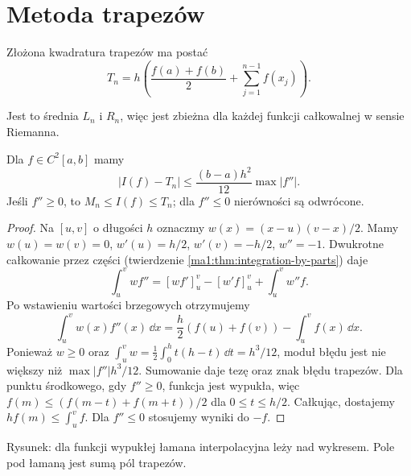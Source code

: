 \section{Metoda trapezów}
\begin{definicja}
\label{ma1:def:trapezoid}
Złożona kwadratura trapezów ma postać
\[
 T_n=h\left(\frac{f(a)+f(b)}2+\sum_{j=1}^{n-1}f(x_j)\right).
\]
\end{definicja}
Jest to średnia $L_n$ i $R_n$, więc jest zbieżna dla każdej funkcji całkowalnej w sensie Riemanna.
\begin{twierdzenie}
\label{ma1:thm:trapezoid-error}
Dla $f\in C^2[a,b]$ mamy
\[
 |I(f)-T_n|\le\frac{(b-a)h^2}{12}\max|f''|.
\]
Jeśli $f''\ge0$, to $M_n\le I(f)\le T_n$; dla $f''\le0$ nierówności są odwrócone.
\end{twierdzenie}
\begin{proof}
Na $[u,v]$ o długości $h$ oznaczmy $w(x)=(x-u)(v-x)/2$. Mamy $w(u)=w(v)=0$, $w'(u)=h/2$, $w'(v)=-h/2$, $w''=-1$. Dwukrotne całkowanie przez części (twierdzenie \ref{ma1:thm:integration-by-parts}) daje
\[
 \int_u^v wf''=[wf']_u^v-[w'f]_u^v+\int_u^v w''f.
\]
Po wstawieniu wartości brzegowych otrzymujemy
\[
 \int_u^v w(x)f''(x)\,\dd x
 =\frac h2(f(u)+f(v))-\int_u^v f(x)\,\dd x.
\]
Ponieważ $w\ge0$ oraz $\int_u^v w=\frac12\int_0^h t(h-t)\,\dd t=h^3/12$, moduł błędu jest nie większy niż $\max|f''|h^3/12$. Sumowanie daje tezę oraz znak błędu trapezów. Dla punktu środkowego, gdy $f''\ge0$, funkcja jest wypukła, więc $f(m)\le(f(m-t)+f(m+t))/2$ dla $0\le t\le h/2$. Całkując, dostajemy $hf(m)\le\int_u^v f$. Dla $f''\le0$ stosujemy wyniki do $-f$.
\end{proof}
\begin{center}

\small Rysunek: dla funkcji wypukłej łamana interpolacyjna leży nad wykresem. Pole pod łamaną jest sumą pól trapezów.
\end{center}

